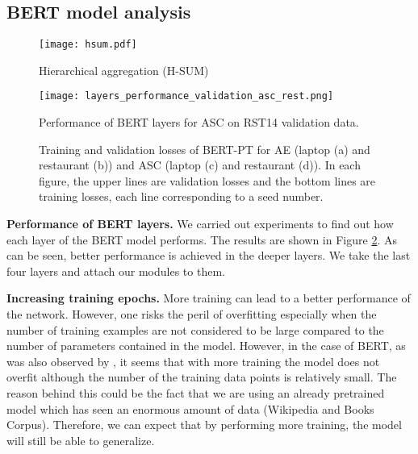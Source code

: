 \documentclass{article}
\begin{document}
\subsection{BERT model analysis}
\begin{figure}[t]
	\centering
	\texttt{[image: hsum.pdf]}
	\caption{Hierarchical aggregation (H-SUM)}
	\label{modelb}
\end{figure}

\begin{figure}
	\centering
	\texttt{[image: layers\_performance\_validation\_asc\_rest.png]}
	\caption{Performance of BERT layers for ASC on RST14 validation data.}
	\label{layers_performance}
\end{figure}


\begin{figure*}[t]
	\centering
	
	\caption{Training and validation losses of BERT-PT for AE (laptop (a) and restaurant (b)) and ASC (laptop (c) and restaurant (d)). In each figure, the upper lines are validation losses and the bottom lines are training losses, each line corresponding to a seed number.}
	\label{val_losses}
\end{figure*}

\textbf{Performance of BERT layers.} 
We carried out experiments to find out how each layer of the BERT model performs. The results are shown in Figure \ref{layers_performance}. As can be seen, better performance is achieved in the deeper layers. We take the last four layers and attach our modules to them. 

\textbf{Increasing training epochs.} 
More training can lead to a better performance of the network. However, one risks the peril of overfitting especially when the number of training examples are not considered to be large compared to the number of parameters contained in the model. However, in the case of BERT, as was also observed by \cite{li2019exploiting}, it seems that with more training the model does not overfit although the number of the training data points is relatively small. The reason behind this could be the fact that we are using an already pretrained model which has seen an enormous amount of data (Wikipedia and Books Corpus). Therefore, we can expect that by performing more training, the model will still be able to generalize. 
\end{document}
